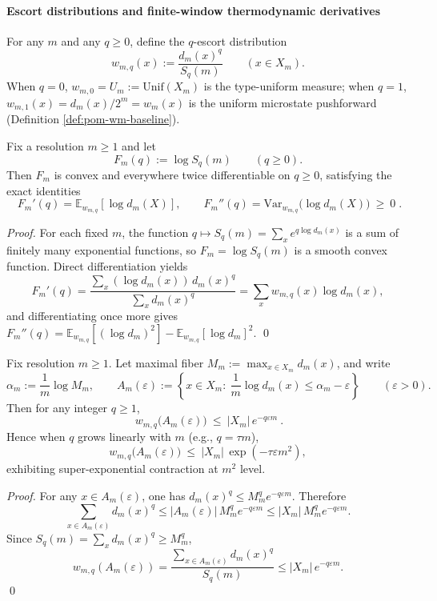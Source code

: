 

\paragraph{Escort distributions and finite-window thermodynamic derivatives}
For any \(m\) and any \(q\ge 0\), define the \(q\)-escort distribution
\[
w_{m,q}(x):=\frac{d_m(x)^q}{S_q(m)}\qquad(x\in X_m).
\]
When \(q=0\), \(w_{m,0}=U_m:=\mathrm{Unif}(X_m)\) is the type-uniform measure;
when \(q=1\), \(w_{m,1}(x)=d_m(x)/2^m=w_m(x)\) is the uniform microstate pushforward (Definition \ref{def:pom-wm-baseline}).

\begin{proposition}\label{prop:pom-escort-derivative-identities}
Fix a resolution \(m\ge 1\) and let
\[
F_m(q):=\log S_q(m)\qquad(q\ge 0).
\]
Then \(F_m\) is convex and everywhere twice differentiable on \(q\ge 0\), satisfying the exact identities
\[
\boxed{\;
F_m'(q)=\mathbb{E}_{w_{m,q}}[\log d_m(X)],\qquad
F_m''(q)=\mathrm{Var}_{w_{m,q}}\!\bigl(\log d_m(X)\bigr)\ \ge\ 0\; }.
\]
\end{proposition}
\begin{proof}
For each fixed \(m\), the function \(q\mapsto S_q(m)=\sum_x e^{q\log d_m(x)}\) is a sum of finitely many exponential functions, so \(F_m=\log S_q(m)\) is a smooth convex function.
Direct differentiation yields
\[
F_m'(q)=\frac{\sum_x (\log d_m(x))\,d_m(x)^q}{\sum_x d_m(x)^q}
=\sum_x w_{m,q}(x)\log d_m(x),
\]
and differentiating once more gives
\(
F_m''(q)=\mathbb{E}_{w_{m,q}}[(\log d_m)^2]-\mathbb{E}_{w_{m,q}}[\log d_m]^2
\).
\qed
\end{proof}

\begin{corollary}\label{cor:pom-escort-zero-temperature-superexp-concentration}
Fix resolution \(m\ge 1\).
Let maximal fiber
\(
M_m:=\max_{x\in X_m} d_m(x)
\), and write
\[
\alpha_m:=\frac1m\log M_m,\qquad
A_m(\varepsilon):=\left\{x\in X_m:\ \frac1m\log d_m(x)\le \alpha_m-\varepsilon\right\}\qquad(\varepsilon>0).
\]
Then for any integer \(q\ge 1\),
\[
\boxed{\ w_{m,q}\bigl(A_m(\varepsilon)\bigr)\ \le\ |X_m|\,e^{-q\varepsilon m}\ }.
\]
Hence when \(q\) grows linearly with \(m\) (e.g., \(q=\tau m\)),
\[
w_{m,q}\bigl(A_m(\varepsilon)\bigr)\ \le\ |X_m|\,\exp(-\tau\varepsilon m^2),
\]
exhibiting super-exponential contraction at \(m^2\) level.
\end{corollary}
\begin{proof}
For any \(x\in A_m(\varepsilon)\), one has \(d_m(x)^q\le M_m^q e^{-q\varepsilon m}\).
Therefore
\[
\sum_{x\in A_m(\varepsilon)} d_m(x)^q \le |A_m(\varepsilon)|\,M_m^q e^{-q\varepsilon m}\le |X_m|\,M_m^q e^{-q\varepsilon m}.
\]
Since \(S_q(m)=\sum_x d_m(x)^q\ge M_m^q\),
\[
w_{m,q}(A_m(\varepsilon))
=\frac{\sum_{x\in A_m(\varepsilon)} d_m(x)^q}{S_q(m)}
\le |X_m|\,e^{-q\varepsilon m}.
\]
\qed
\end{proof}

